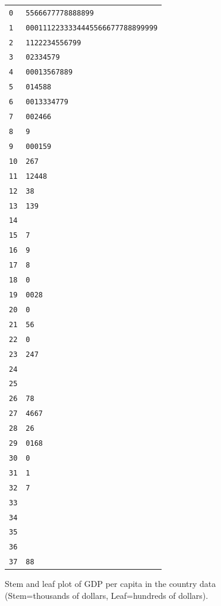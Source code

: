 \begin{figure}
\caption{Stem and leaf plot of GDP per capita in the country data
(Stem=thousands of dollars, Leaf=hundreds of dollars).}
\label{f_stemgdp}
\vspace*{2ex}
\begin{tabular}{l|l}
\texttt{0} & \texttt{5566677778888899}\\
\texttt{1} & \texttt{0001112233334445566677788899999} \\
\texttt{2} & \texttt{1122234556799}\\
\texttt{3} & \texttt{02334579}\\
\texttt{4} & \texttt{00013567889}\\
\texttt{5} & \texttt{014588}\\
\texttt{6} & \texttt{0013334779}\\
\texttt{7} & \texttt{002466}\\
\texttt{8} & \texttt{9} \\
\texttt{9} & \texttt{000159}\\
\texttt{10}& \texttt{267}\\
\texttt{11}& \texttt{12448}\\
\texttt{12}& \texttt{38}\\
\texttt{13}& \texttt{139}\\
\texttt{14}& \\
\texttt{15}& \texttt{7}\\
\texttt{16}& \texttt{9}\\
\texttt{17}& \texttt{8}\\
\texttt{18}& \texttt{0}\\
\texttt{19}& \texttt{0028}\\
\texttt{20}& \texttt{0}\\
\texttt{21}& \texttt{56}\\
\texttt{22}& \texttt{0}\\
\texttt{23}& \texttt{247}\\
\texttt{24} & \\
\texttt{25} & \\
\texttt{26} & \texttt{78}\\
\texttt{27} & \texttt{4667}\\
\texttt{28} & \texttt{26}\\
\texttt{29} & \texttt{0168}\\
\texttt{30} & \texttt{0}\\
\texttt{31} & \texttt{1}\\
\texttt{32} & \texttt{7}\\
\texttt{33} & \\
\texttt{34} & \\
\texttt{35} & \\
\texttt{36} & \\
\texttt{37} & \texttt{88}
\end{tabular}
\end{figure}

